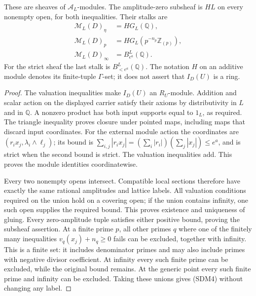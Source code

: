 \begin{theorem}\label{SDM:sheaf}
These are sheaves of $\mathcal A_L$-modules. The amplitude-zero
subsheaf is $HL$ on every nonempty open, for both inequalities.
Their stalks are
\begin{equation}\tag{SDM4}
 \begin{aligned}
 \mathcal M_L(D)_\eta&=HG_L(\mathbb Q),\\
 \mathcal M_L(D)_p&=HG_L(p^{-n_p}\mathbb Z_{(p)}),\\
 \mathcal M_L(D)_\infty&=B_{e^a}^L(\mathbb Q).
 \end{aligned}
\end{equation}
For the strict sheaf the last stalk is $B_{<e^a}^L(\mathbb Q)$.
The notation $H$ on an additive module denotes its finite-tuple
$\Gamma$-set; it does not assert that $I_D(U)$ is a ring.
\end{theorem}
\begin{proof}
The valuation inequalities make $I_D(U)$ an $R_U$-module. Addition
and scalar action on the displayed carrier satisfy their axioms
by distributivity in $L$ and in $\mathbb Q$. A nonzero product has
both input supports equal to $1_L$, as required. The triangle
inequality proves closure under pointed maps, including maps that
discard input coordinates. For the external module action the
coordinates are $(r_i x_j,\lambda_i\wedge\ell_j)$; its bound is
$\sum_{i,j}|r_i x_j|=(\sum_i|r_i|)(\sum_j|x_j|)\le e^a$,
and is strict when the second bound is strict. The valuation
inequalities add. This proves the module identities coordinatewise.

Every two nonempty opens intersect. Compatible local sections
therefore have exactly the same rational amplitudes and lattice
labels. All valuation conditions required on the union hold on a
covering open; if the union contains infinity, one such open supplies
the required bound. This proves existence and uniqueness of gluing.
Every zero-amplitude tuple satisfies either positive bound, proving
the subsheaf assertion. At a finite prime $p$, all other primes $q$
where one of the finitely many inequalities $v_q(x_j)+n_q\ge0$
fails can be excluded, together with infinity. This is a finite
set: it includes denominator primes and may also include primes with
negative divisor coefficient. At infinity every such finite prime
can be excluded, while the original bound remains. At the generic
point every such finite prime and infinity can be excluded.
Taking these unions gives (SDM4) without changing any label.
\end{proof}

